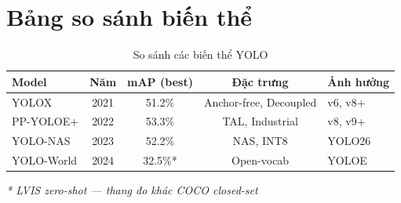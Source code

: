 \section{Bảng so sánh biến thể}
\begin{table}[H]\centering
\caption{So sánh các biến thể YOLO}
\begin{tabular}{lcccl}\toprule
\textbf{Model} & \textbf{Năm} & \textbf{mAP (best)} & \textbf{Đặc trưng} & \textbf{Ảnh hưởng}\\\midrule
YOLOX & 2021 & 51.2\% & Anchor-free, Decoupled & v6, v8+ \\
PP-YOLOE+ & 2022 & 53.3\% & TAL, Industrial & v8, v9+ \\
YOLO-NAS & 2023 & 52.2\% & NAS, INT8 & YOLO26 \\
YOLO-World & 2024 & 32.5\%* & Open-vocab & YOLOE \\
\bottomrule
\end{tabular}
\end{table}
\textit{* LVIS zero-shot — thang đo khác COCO closed-set}

